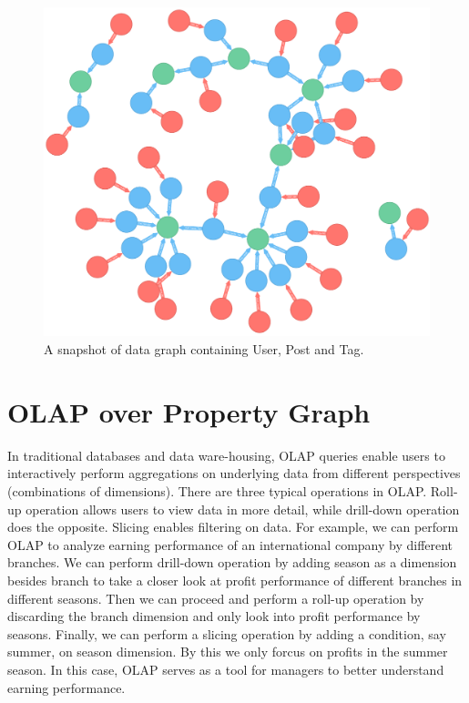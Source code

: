 \begin{figure}
	\centering
	\includegraphics[scale=0.5]{pic/3.pdf}
	\caption{A snapshot of data graph containing User, Post and Tag.}
	\label{fig:3}
\end{figure}

\section{OLAP over Property Graph}

In traditional databases and data ware-housing, OLAP queries enable users to interactively perform aggregations on underlying data from different perspectives (combinations  of dimensions). There are three typical operations in OLAP. Roll-up operation allows users to view data in more detail, while drill-down operation does the opposite. Slicing enables filtering on data. For example, we can perform OLAP to analyze earning performance of an international company by different branches. We can perform drill-down operation by adding season as a dimension besides branch to take a closer look at profit performance of different branches in different seasons. Then we can proceed and perform a roll-up operation by discarding the branch dimension and only look into profit performance by seasons. Finally, we can perform a slicing operation by adding a condition, say summer, on season dimension. By this we only forcus on profits in the summer season. In this case, OLAP serves as a tool for managers to better understand earning performance.

